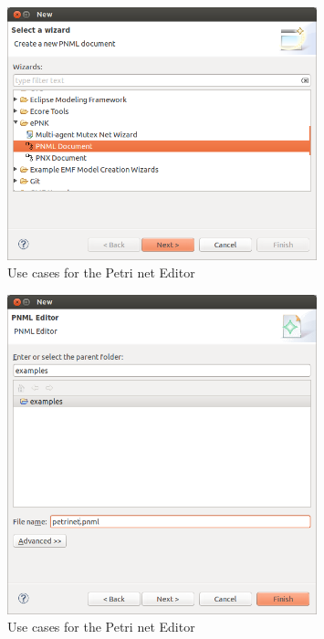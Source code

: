 \begin{figure}[htp]
\begin{center}
  \includegraphics[width=0.8\textwidth]{image/petrinet1.png}
  \caption{Use cases for the Petri net Editor}
  \label{fig:petrinet1}
\end{center}
\end{figure}

\begin{figure}[htp]
\begin{center}
  \includegraphics[width=0.8\textwidth]{image/petrinet2.png}
  \caption{Use cases for the Petri net Editor}
  \label{fig:petrinet2}
\end{center}
\end{figure}

